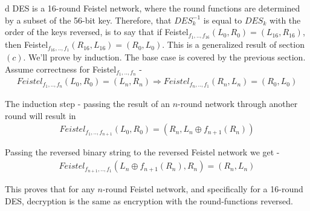 \documentclass{article}
\begin{document}
\begin{paragraph}
	d DES is a 16-round Feistel network, where the round functions are determined by a subset of the 56-bit key. Therefore, that $DES_k^{-1}$ is equal to $DES_k$ with the order of the keys reversed, is to say that if Feistel$_{f_1,..,f_{16}}(L_0, R_0) = (L_{16},R_{16})$, then Feistel$_{f_{16},..,f_1}(R_{16},L_{16}) = (R_0, L_0)$. This is a generalized result of section $(c)$. We'll prove by induction. The base case is covered by the previous section. Assume correctness for Feistel$_{f_1,..,f_n}$ - 
	\begin{align*}
		Feistel_{f_1,..,f_n}(L_0,R_0) = (L_n,R_n) \Rightarrow Feistel_{f_n,..,f_1}(R_n,L_n) = (R_0, L_0)
	\end{align*}
	
	The induction step - passing the result of an $n$-round network through another round will result in
	\begin{align*}
		Feistel_{f_1,..,f_{n+1}}(L_0,R_0) = (R_n, L_n\oplus f_{n+1}(R_n))
	\end{align*}
	
	Passing the reversed binary string to the reversed Feistel network we get - 
	\begin{align*}
		Feistel_{f_{n+1},..,f_1}(L_n\oplus f_{n+1}(R_n),R_n) = (R_n,L_n)
	\end{align*}
	
	This proves that for any $n$-round Feistel network, and specifically for a 16-round DES, decryption is the same as encryption with the round-functions reversed.
\end{paragraph}
\end{document}
